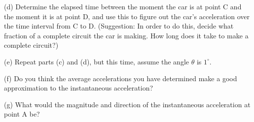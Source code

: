 \documentclass{article}
\begin{document}
\vfil

(d) Determine the elapsed time between the moment the car is at
point C and the moment it is at point D, and use this to figure out
the car's acceleration over the time interval from C to D.
(Suggestion: In order to do this, decide what fraction of a complete
circuit the car is making.  How long does it take to make a complete circuit?)

\vfil\eject

(e) Repeat parts (c) and (d), but this time, assume the angle $\theta$ is 
$1^\circ$.

\vfil

(f) Do you think the average accelerations you have determined make a good
approximation to the instantaneous acceleration?

\vskip 0.8in

(g) What would the magnitude and direction of the instantaneous acceleration
at point A be?

\vskip 0.8in\eject
\end{document}
